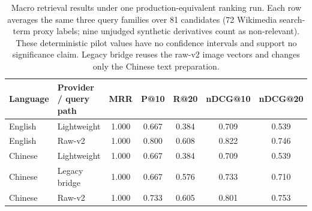 \begin{table}[t]
\centering
\caption{Macro retrieval results under one production-equivalent ranking run. Each row averages the same three query families over 81 candidates (72 Wikimedia search-term proxy labels; nine unjudged synthetic derivatives count as non-relevant). These deterministic pilot values have no confidence intervals and support no significance claim. Legacy bridge reuses the raw-v2 image vectors and changes only the Chinese text preparation.}
\label{tab:openclip-raw-v2-proxy}
\small
\setlength{\tabcolsep}{4pt}
\begin{tabular}{llccccc}
\toprule
Language & Provider / query path & MRR & P@10 & R@20 & nDCG@10 & nDCG@20 \\
\midrule
English & Lightweight & 1.000 & 0.667 & 0.384 & 0.709 & 0.539 \\
English & Raw-v2 & 1.000 & 0.800 & 0.608 & 0.822 & 0.746 \\
\midrule
Chinese & Lightweight & 1.000 & 0.667 & 0.384 & 0.709 & 0.539 \\
Chinese & Legacy bridge & 1.000 & 0.667 & 0.576 & 0.733 & 0.710 \\
Chinese & Raw-v2 & 1.000 & 0.733 & 0.605 & 0.801 & 0.753 \\
\bottomrule
\end{tabular}
\end{table}
